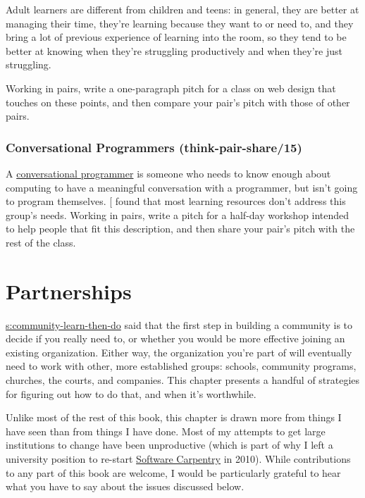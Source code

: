 Adult learners are different from children and teens: in general, they
are better at managing their time, they're learning because they want to
or need to, and they bring a lot of previous experience of learning into
the room, so they tend to be better at knowing when they're struggling
productively and when they're just struggling.

Working in pairs, write a one-paragraph pitch for a class on web design
that touches on these points, and then compare your pair's pitch with
those of other pairs.

\subsection{Conversational Programmers (think-pair-share/15)}\label{conversational-programmers-think-pair-share15}

A \protect\hyperlink{g:conversational-programmer}{conversational programmer}
is someone who needs to know enough about computing to have a meaningful
conversation with a programmer, but isn't going to program themselves.
{[}\protect[\hyperlink{b:Wang2018}{Wang2018}]{]} found that most learning resources don't address this
group's needs. Working in pairs, write a pitch for a half-day workshop
intended to help people that fit this description, and then share your
pair's pitch with the rest of the class.

\chapter{Partnerships}\label{s:partner}

\protect\hyperlink{SECTION}{s:community-learn-then-do} said that the first step in
building a community is to decide if you really need to, or whether you
would be more effective joining an existing organization. Either way,
the organization you're part of will eventually need to work with other,
more established groups: schools, community programs, churches, the
courts, and companies. This chapter presents a handful of strategies for
figuring out how to do that, and when it's worthwhile.

Unlike most of the rest of this book, this chapter is drawn more from
things I have seen than from things I have done. Most of my attempts
to get large institutions to change have been unproductive (which is
part of why I left a university position to re-start \href{http://software-carpentry.org}{Software
Carpentry} in 2010). While contributions to any part of this book
are welcome, I would be particularly grateful to hear what you have to
say about the issues discussed below.

